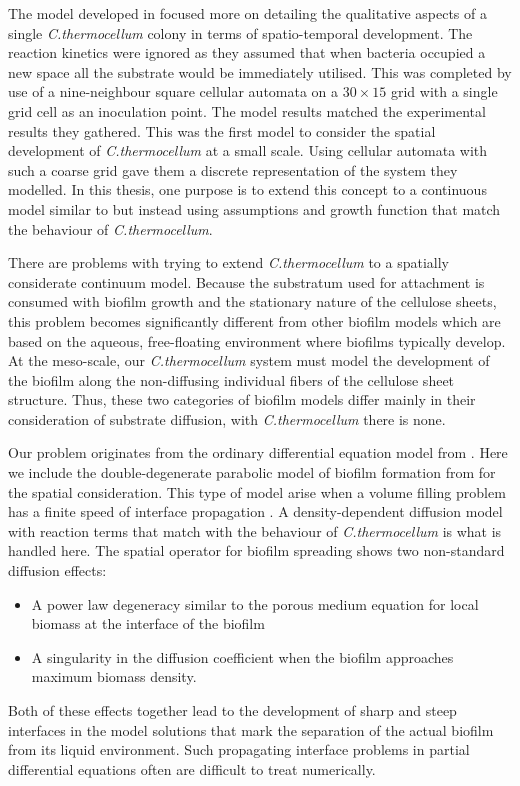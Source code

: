 The model developed in \cite{wang2011spatial} focused more on detailing the qualitative aspects of a single \textit{C.thermocellum} colony in terms of spatio-temporal development.  
The reaction kinetics were ignored as they assumed that when bacteria occupied a new space all the substrate would be immediately utilised.
This was completed by use of a nine-neighbour square cellular automata on a $30 \times 15$ grid with a single grid cell as an inoculation point.
The model results matched the experimental results they gathered.
This was the first model to consider the spatial development of \textit{C.thermocellum} at a small scale.
Using cellular automata with such a coarse grid gave them a discrete representation of the system they modelled.
In this thesis, one purpose is to extend this concept to a continuous model similar to \cite{eberl2001deterministic} but instead using assumptions and growth function that match the behaviour of \textit{C.thermocellum}.

There are problems with trying to extend \textit{C.thermocellum} to a spatially considerate continuum model.
Because the substratum used for attachment is consumed with biofilm growth and the stationary nature of the cellulose sheets, this problem becomes significantly different from other biofilm models which are based on the aqueous, free-floating environment where biofilms typically develop.
At the meso-scale, our \textit{C.thermocellum} system must model the development of the biofilm along the non-diffusing individual fibers of the cellulose sheet structure.
Thus, these two categories of biofilm models differ mainly in their consideration of substrate diffusion, with \textit{C.thermocellum} there is none.

Our problem originates from the ordinary differential equation model from \cite{dumitrache2015mathematicalModeling}.
Here we include the double-degenerate parabolic model of biofilm formation from \cite{eberl2001deterministic} for the spatial consideration.
This type of model arise when a volume filling problem has a finite speed of interface propagation \citep{khassehkhan2009nonlinearMaster}.
A density-dependent diffusion model with reaction terms that match with the behaviour of \textit{C.thermocellum} is what is handled here.
The spatial operator for biofilm spreading shows two non-standard diffusion effects:
\begin{itemize} 
  \item A power law degeneracy similar to the porous medium equation for local biomass at the interface of the biofilm \cite{gurtin1977diffusion}
  \item A singularity in the diffusion coefficient when the biofilm approaches maximum biomass density. 
\end{itemize}
Both of these effects together lead to the development of sharp and steep interfaces in the model solutions that mark the separation of the actual biofilm from its liquid environment.
Such propagating interface problems in partial differential equations often are difficult to treat numerically.

